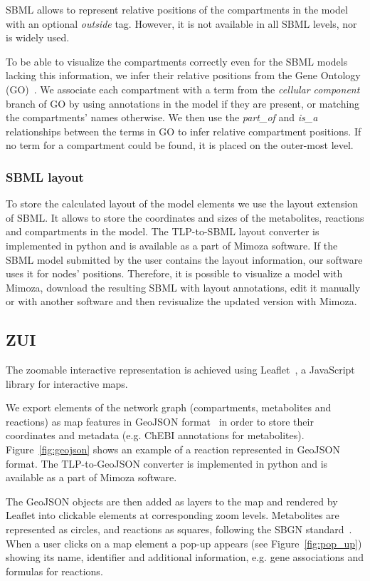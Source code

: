 \documentclass{bmcart}
\begin{document}
SBML allows to represent relative positions of the compartments in the model with an optional \emph{outside} tag. However, it is not available in all SBML levels, nor is widely used.

To be able to visualize the compartments correctly even for the SBML models lacking this information, we infer their relative positions from the Gene Ontology (GO)~\cite{Ashburner2000}. We associate each compartment with a term from the \emph{cellular component} branch of GO by using annotations in the model if they are present, or matching the compartments' names otherwise. We then use the \emph{part\_of} and \emph{is\_a} relationships between the terms in GO to infer relative compartment positions. If no term for a compartment could be found, it is placed on the outer-most level. 

\subsubsection*{SBML layout}
To store the calculated layout of the model elements we use the layout extension~\cite{Gauges2013} of SBML. It allows to store the coordinates and sizes of the metabolites, reactions and compartments in the model. The TLP-to-SBML layout converter is implemented in python and is available as a part of Mimoza software.
If the SBML model submitted by the user contains the layout information, our software uses it for nodes' positions. Therefore, it is possible to visualize a model with Mimoza, download the resulting SBML with layout annotations, edit it manually or with another software and then revisualize the updated version with Mimoza.
 
\subsection*{ZUI}

The zoomable interactive representation is achieved using Leaflet~\cite{Agafonkin}, a JavaScript library for interactive maps. 

We export elements of the network graph (compartments, metabolites and reactions) as map features in GeoJSON format~\cite{Butler} in order to store their coordinates and metadata (e.g. ChEBI annotations for metabolites). Figure~\ref{fig:geojson} shows an example of a reaction represented in GeoJSON format. The TLP-to-GeoJSON converter is implemented in python and is available as a part of Mimoza software. 

The GeoJSON objects are then added as layers to the map and rendered by Leaflet into clickable elements at corresponding zoom levels. Metabolites are represented as circles, and reactions as squares, following the SBGN standard~\cite{LeNovere2009}.  When a user clicks on a map element a pop-up appears (see Figure~\ref{fig:pop_up}) showing its name, identifier and additional information, e.g. gene associations and formulas for reactions. 
 
\end{document}
